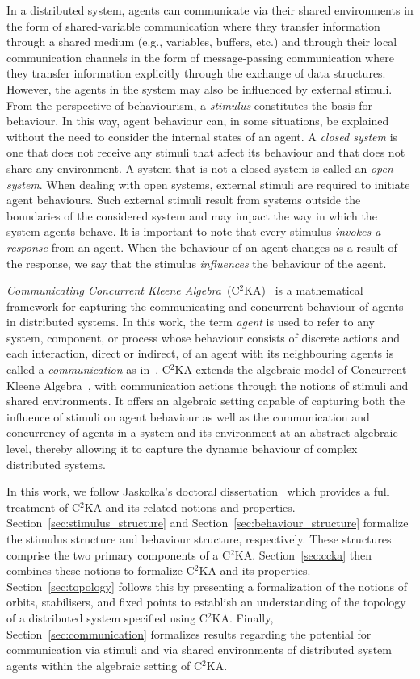 \documentclass[11pt,a4paper]{article}
\makeatletter
\newcommand{\CCKA}{Communicating Concurrent Kleene Algebra\@\xspace}
\newcommand{\CCKAabbrv}{\textup{C$^2$KA}\@\xspace}
\makeatother
\begin{document}
In a distributed system, agents can communicate via their shared environments in the form of shared-variable communication where they transfer information through a shared medium (e.g., variables, buffers, etc.) and through their local communication channels in the form of message-passing communication where they transfer information explicitly through the exchange of data structures. However, the agents in the system may also be influenced by external stimuli. From the perspective of behaviourism, a \emph{stimulus} constitutes the basis for behaviour. In this way, agent behaviour can, in some situations, be explained without the need to consider the internal states of an agent. A \emph{closed system} is one that does not receive any stimuli that affect its behaviour and that does not share any environment. A system that is not a closed system is called an \emph{open system}. When dealing with open systems, external stimuli are required to initiate agent behaviours. Such external stimuli result from systems outside the boundaries of the considered system and may impact the way in which the system agents behave. It is important to note that every stimulus \emph{invokes a response} from an agent. When the behaviour of an agent changes as a result of the response, we say that the stimulus \emph{influences} the behaviour of the agent. 

\emph{\CCKA}~(\CCKAabbrv)~\cite{Jaskolka2015ab,Jaskolka2014aa} is a mathematical framework for capturing the communicating and concurrent behaviour of agents in distributed systems. In this work, the term \emph{agent} is used to refer to any system, component, or process whose behaviour consists of discrete actions and each interaction, direct or indirect, of an agent with its neighbouring agents is called a \emph{communication} as in~\cite{Milner1989aa}. \CCKAabbrv extends the algebraic model of Concurrent Kleene Algebra~\cite{Hoare2011aa}, with communication actions through the notions of stimuli and shared environments. It offers an algebraic setting capable of capturing both the influence of stimuli on agent behaviour as well as the communication and concurrency of agents in a system and its environment at an abstract algebraic level, thereby allowing it to capture the dynamic behaviour of complex distributed systems.

In this work, we follow Jaskolka's doctoral dissertation~\cite{Jaskolka2015ab} which provides a full treatment of \CCKAabbrv and its related notions and properties. Section~\ref{sec:stimulus_structure} and Section~\ref{sec:behaviour_structure} formalize the stimulus structure and behaviour structure, respectively. These structures comprise the two primary components of a \CCKAabbrv. Section~\ref{sec:ccka} then combines these notions to formalize \CCKAabbrv and its properties. Section~\ref{sec:topology} follows this by presenting a formalization of the notions of orbits, stabilisers, and fixed points to establish an understanding of the topology of a distributed system specified using \CCKAabbrv. Finally, Section~\ref{sec:communication} formalizes results regarding the potential for communication via stimuli and via shared environments of distributed system agents within the algebraic setting of \CCKAabbrv.





\end{document}
